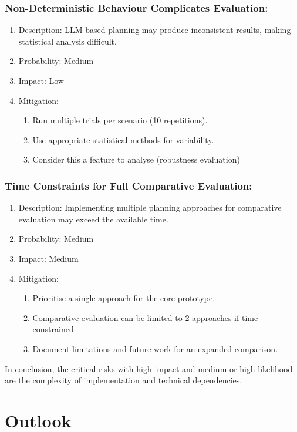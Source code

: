 \documentclass[12pt]{article}
\begin{document}
\subsubsection{Non-Deterministic Behaviour Complicates Evaluation:}
\begin{enumerate}
    \item Description: LLM-based planning may produce inconsistent results, making statistical analysis difficult.
    \item Probability: Medium
    \item Impact: Low
    \item Mitigation: 
  \begin{enumerate}
      \item Run multiple trials per scenario (10 repetitions).
    \item Use appropriate statistical methods for variability.
    \item Consider this a feature to analyse (robustness evaluation)
    \end{enumerate}
\end{enumerate}
\subsubsection{Time Constraints for Full Comparative Evaluation:}
\begin{enumerate}
    \item Description: Implementing multiple planning approaches for comparative evaluation may exceed the available time.
    \item Probability: Medium
    \item Impact: Medium
    \item Mitigation: 
  \begin{enumerate}
      \item Prioritise a single approach for the core prototype.
    \item Comparative evaluation can be limited to 2 approaches if time-constrained
    \item Document limitations and future work for an expanded comparison.
    \end{enumerate}
\end{enumerate}
In conclusion, the critical risks with high impact and medium or high likelihood are the complexity of implementation and technical dependencies.

\section{Outlook}
\end{document}

